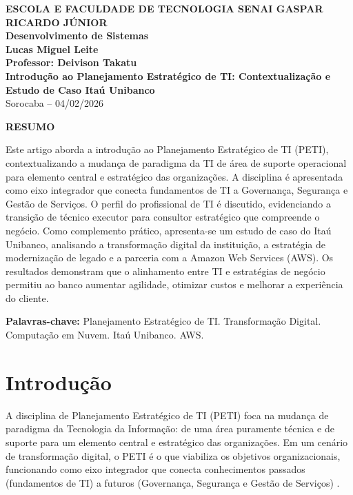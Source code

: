 \documentclass[12pt,a4paper,oneside]{article}
\begin{document}
\begin{center}
  \textbf{\large ESCOLA E FACULDADE DE TECNOLOGIA SENAI GASPAR RICARDO JÚNIOR}\\
  \textbf{Desenvolvimento de Sistemas}\\[1cm]
  \textbf{\Large Lucas Miguel Leite}\\[0.5cm]
  \textbf{Professor: Deivison Takatu}\\[2cm]
  \textbf{\LARGE\textbf{Introdução ao Planejamento Estratégico de TI: Contextualização e Estudo de Caso Itaú Unibanco}}\\[1cm]
  Sorocaba -- 04/02/2026
\end{center}

\vspace{1cm}

\begin{center}
  \textbf{RESUMO}
\end{center}

Este artigo aborda a introdução ao Planejamento Estratégico de TI (PETI), contextualizando a mudança de paradigma da TI de área de suporte operacional para elemento central e estratégico das organizações. A disciplina é apresentada como eixo integrador que conecta fundamentos de TI a Governança, Segurança e Gestão de Serviços. O perfil do profissional de TI é discutido, evidenciando a transição de técnico executor para consultor estratégico que compreende o negócio. Como complemento prático, apresenta-se um estudo de caso do Itaú Unibanco, analisando a transformação digital da instituição, a estratégia de modernização de legado e a parceria com a Amazon Web Services (AWS). Os resultados demonstram que o alinhamento entre TI e estratégias de negócio permitiu ao banco aumentar agilidade, otimizar custos e melhorar a experiência do cliente.

\vspace{0.5cm}
\textbf{Palavras-chave:} Planejamento Estratégico de TI. Transformação Digital. Computação em Nuvem. Itaú Unibanco. AWS.

\newpage

\section{Introdução}

A disciplina de Planejamento Estratégico de TI (PETI) foca na mudança de paradigma da Tecnologia da Informação: de uma área puramente técnica e de suporte para um elemento central e estratégico das organizações. Em um cenário de transformação digital, o PETI é o que viabiliza os objetivos organizacionais, funcionando como eixo integrador que conecta conhecimentos passados (fundamentos de TI) a futuros (Governança, Segurança e Gestão de Serviços) \cite{tarapanoff2015}.
\end{document}
